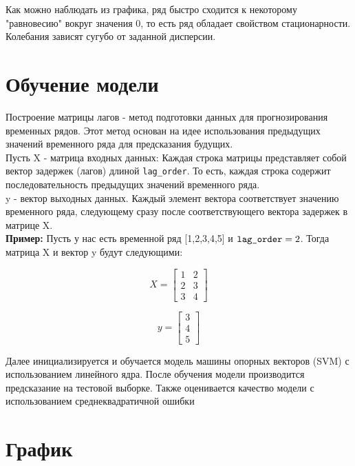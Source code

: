 \documentclass{article}
\begin{document}
\begin{figure}[h]
    \centering
    
\end{figure}

Как можно наблюдать из графика, ряд быстро сходится к некоторому "равновесию" вокруг значения 0, то есть ряд обладает свойством стационарности.
Колебания зависят сугубо от заданной дисперсии.

\section{Обучение модели}

Построение матрицы лагов - метод подготовки данных для прогнозирования временных рядов.  Этот метод основан на идее использования предыдущих значений временного ряда для предсказания будущих.\\

Пусть X - матрица входных данных: Каждая строка матрицы представляет собой вектор задержек (лагов) длиной \verb|lag_order|. То есть, каждая строка содержит последовательность предыдущих значений временного ряда.\\

y - вектор выходных данных. Каждый элемент вектора соответствует значению временного ряда, следующему сразу после соответствующего вектора задержек в матрице X.\\

\textbf{Пример:} Пусть у нас есть временной ряд [1,2,3,4,5] и $\verb|lag_order| = 2$. Тогда матрица X и вектор y будут следующими:

$$X = \begin{bmatrix}
        1 & 2 \\
        2 & 3 \\
        3 & 4
    \end{bmatrix}$$

$$y = \begin{bmatrix}
        3 \\
        4 \\
        5
    \end{bmatrix}$$

Далее инициализируется и обучается модель машины опорных векторов (SVM) с использованием линейного ядра. После обучения модели производится предсказание на тестовой выборке. Также оценивается качество модели с использованием среднеквадратичной ошибки

\section{График}
\begin{figure}[h]
    \centering
    \\
    \caption{}
\end{figure}
\end{document}
